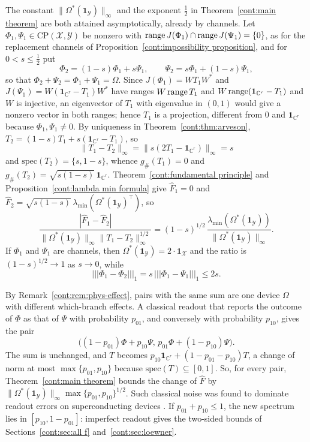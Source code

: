 \begin{remark*}
The constant $\|\Omega^*(\mathbf{1}_{\mathcal{Y}})\|_\infty$ and the exponent $\frac12$ in Theorem~\ref{cont:main theorem} are both attained asymptotically, already by channels. Let $\Phi_1,\Psi_1\in\mathrm{CP}(\mathcal{X},\mathcal{Y})$ be nonzero with $\operatorname{range} J(\Phi_1)\cap\operatorname{range} J(\Psi_1)=\{0\}$, as for the replacement channels of Proposition~\ref{cont:impossibility proposition}, and for $0<s\leq\frac12$ put
\[
\Phi_2=(1-s)\Phi_1+s\Psi_1,\qquad\Psi_2=s\Phi_1+(1-s)\Psi_1 ,
\]
so that $\Phi_2+\Psi_2=\Phi_1+\Psi_1=\Omega$. Since $J(\Phi_1)=WT_1W^*$ and $J(\Psi_1)=W(\mathbf{1}_{\mathbb{C}^r}-T_1)W^*$ have ranges $W\operatorname{range} T_1$ and $W\operatorname{range}(\mathbf{1}_{\mathbb{C}^r}-T_1)$ and $W$ is injective, an eigenvector of $T_1$ with eigenvalue in $(0,1)$ would give a nonzero vector in both ranges; hence $T_1$ is a projection, different from $0$ and $\mathbf{1}_{\mathbb{C}^r}$ because $\Phi_1,\Psi_1\neq0$. By uniqueness in Theorem~\ref{cont:thm:arveson}, $T_2=(1-s)T_1+s(\mathbf{1}_{\mathbb{C}^r}-T_1)$, so
\[
\|T_1-T_2\|_\infty=\|s(2T_1-\mathbf{1}_{\mathbb{C}^r})\|_\infty=s
\]
and $\mathrm{spec}(T_2)=\{s,1-s\}$, whence $g_\#(T_1)=0$ and $g_\#(T_2)=\sqrt{s(1-s)}\,\mathbf{1}_{\mathbb{C}^r}$. Theorem~\ref{cont:fundamental principle} and Proposition~\ref{cont:lambda min formula} give $\widehat{F}_1=0$ and $\widehat{F}_2=\sqrt{s(1-s)}\,\lambda_{\min}(\Omega^*(\mathbf{1}_{\mathcal{Y}})^\top)$, so
\[
\frac{|\widehat{F}_1-\widehat{F}_2|}{\|\Omega^*(\mathbf{1}_{\mathcal{Y}})\|_\infty\|T_1-T_2\|_\infty^{1/2}}=(1-s)^{1/2}\,\frac{\lambda_{\min}(\Omega^*(\mathbf{1}_{\mathcal{Y}}))}{\|\Omega^*(\mathbf{1}_{\mathcal{Y}})\|_\infty}.
\]
If $\Phi_1$ and $\Psi_1$ are channels, then $\Omega^*(\mathbf{1}_{\mathcal{Y}})=2\cdot\mathbf{1}_{\mathcal{X}}$ and the ratio is $(1-s)^{1/2}\to1$ as $s\to0$, while
\[
|||\Phi_1-\Phi_2|||_1=s\,|||\Phi_1-\Psi_1|||_1\leq2s.
\]
\end{remark*}
\begin{remark}\label{cont:rem:phys-readout}
By Remark~\ref{cont:rem:phys-effect}, pairs with the same sum are one device $\Omega$ with different which-branch effects. A classical readout that reports the outcome of $\Phi$ as that of $\Psi$ with probability $p_{01}$, and conversely with probability $p_{10}$, gives the pair
\[
\big((1-p_{01})\Phi+p_{10}\Psi,\,p_{01}\Phi+(1-p_{10})\Psi\big).
\]
The sum is unchanged, and $T$ becomes $p_{10}\mathbf{1}_{\mathbb{C}^r}+(1-p_{01}-p_{10})T$, a change of norm at most $\max\{p_{01},p_{10}\}$ because $\mathrm{spec}(T)\subseteq[0,1]$. So, for every pair, Theorem~\ref{cont:main theorem} bounds the change of $\widehat{F}$ by $\|\Omega^*(\mathbf{1}_{\mathcal{Y}})\|_\infty\max\{p_{01},p_{10}\}^{1/2}$. Such classical noise was found to dominate readout errors on superconducting devices \cite{MaciejewskiZimborasOszmaniec2020}. If $p_{01}+p_{10}\leq1$, the new spectrum lies in $[p_{10},1-p_{01}]$: imperfect readout gives the two-sided bounds of Sections~\ref{cont:sec:all f} and~\ref{cont:sec:loewner}.
\end{remark}
